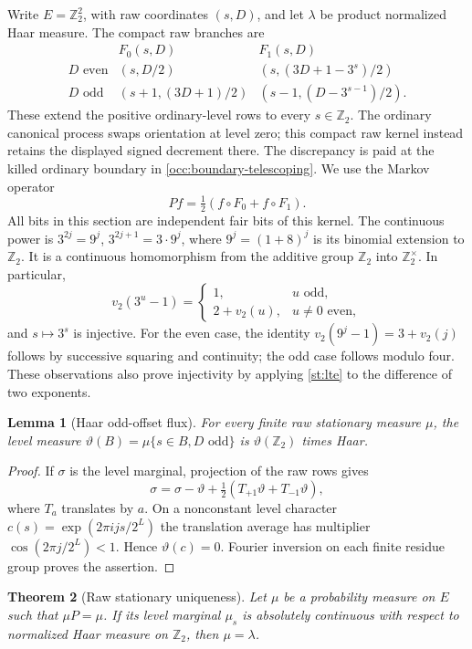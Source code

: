 \documentclass[11pt]{amsart}
\newtheorem{theorem}{Theorem}[section]
\newtheorem{lemma}[theorem]{Lemma}
\theoremstyle{definition}
\theoremstyle{remark}
\newcommand{\Ztwo}{\mathbb Z_2}
\begin{document}
Write $E=\Ztwo^2$, with raw coordinates $(s,D)$, and let $\lambda$ be
product normalized Haar measure.  The compact raw branches are
\[
\begin{array}{c|c|c}
 &F_0(s,D)&F_1(s,D)\\\hline
 D\text{ even}&(s,D/2)&(s,(3D+1-3^s)/2)\\
 D\text{ odd}&(s+1,(3D+1)/2)&(s-1,(D-3^{s-1})/2).
\end{array}
\]
These extend the positive ordinary-level rows to every $s\in\Ztwo$.
The ordinary canonical process swaps orientation at level zero; this
compact raw kernel instead retains the displayed signed decrement there.
The discrepancy is paid at the killed ordinary boundary in
\eqref{occ:boundary-telescoping}. We use the Markov operator
\[
 Pf=\tfrac12(f\circ F_0+f\circ F_1).
\]
All bits in this section are independent fair bits of this kernel.  The
continuous power is $3^{2j}=9^j$, $3^{2j+1}=3\cdot9^j$, where
$9^j=(1+8)^j$ is its binomial extension to $\Ztwo$.  It is a continuous
homomorphism from the additive group $\Ztwo$ into $\Ztwo^\times$.  In
particular,
\begin{equation}
 v_2(3^u-1)=
 \begin{cases}1,&u\text{ odd},\\2+v_2(u),&u\ne0\text{ even},\end{cases}
 \label{st:lte}
\end{equation}
and $s\mapsto3^s$ is injective.  For the even case, the identity
$v_2(9^j-1)=3+v_2(j)$ follows by successive squaring and continuity;
the odd case follows modulo four.  These observations also prove
injectivity by applying \eqref{st:lte} to the difference of two exponents.

\begin{lemma}[Haar odd-offset flux]\label{st:level-flux}
For every finite raw stationary measure $\mu$, the level measure
$\vartheta(B)=\mu\{s\in B,D\text{ odd}\}$ is $\vartheta(\Ztwo)$ times Haar.
\end{lemma}
\begin{proof}
If $\sigma$ is the level marginal, projection of the raw rows gives
\[
 \sigma=\sigma-\vartheta+
       \tfrac12(T_{+1}\vartheta+T_{-1}\vartheta),
\]
where $T_a$ translates by $a$.  On a nonconstant level character
$c(s)=\exp(2\pi i js/2^L)$ the translation average has multiplier
$\cos(2\pi j/2^L)<1$.  Hence $\vartheta(c)=0$.
Fourier inversion on each finite residue group proves the assertion.
\end{proof}

\begin{theorem}[Raw stationary uniqueness]\label{st:uniqueness}
Let $\mu$ be a probability measure on $E$ such that $\mu P=\mu$.  If its
level marginal $\mu_s$ is absolutely continuous with respect to normalized
Haar measure on $\Ztwo$, then $\mu=\lambda$.
\end{theorem}
\end{document}
